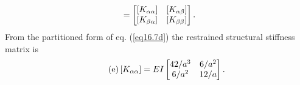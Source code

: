 \documentclass{AeroStructure-ERJohnson}
\begin{document}
\begin{example*}
\begin{align}
\begin{array}{@{}c@{}}
\end{array}
=\left[\begin{array}{@{}ll@{}}{\left[K_{\alpha \alpha}\right]} & {\left[K_{\alpha \beta}\right]} \\{\left[K_{\beta \alpha}\right]} & {\left[K_{\beta \beta}\right]}\end{array}\right].
\end{align}
From the partitioned form of eq. (\ref{eq16.7d}) the restrained structural stiffness matrix is
\begin{align}\label{eq16.7e}\tag{e}
\left[K_{\alpha \alpha}\right]=E I\left[\begin{array}{@{}cc@{}}42 / a^{3} & 6 / a^{2} \\6 / a^{2} & 12 / a\end{array}\right].
\end{align}

\vspace*{-1pc}


\end{example*}
\end{document}
